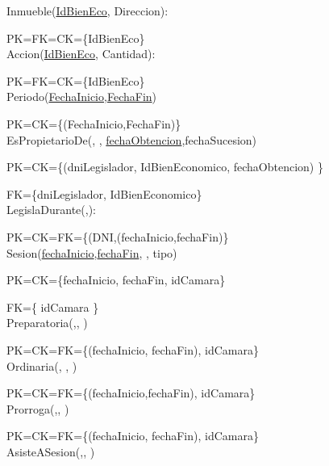 Inmueble(\underline{IdBienEco}, Direccion):

PK=FK=CK={\{IdBienEco}\}\\

Accion(\underline{IdBienEco}, Cantidad):

PK=FK=CK={\{IdBienEco}\}\\

Periodo(\underline{FechaInicio},\underline{FechaFin})

PK=CK={\{(FechaInicio,FechaFin)}\}\\

EsPropietarioDe(\underline{}, \underline{}, \underline{fechaObtencion},fechaSucesion)

PK=CK={\{(dniLegislador, IdBienEconomico, fechaObtencion) }\}

FK={\{dniLegislador, IdBienEconomico}\}\\

LegislaDurante(\underline{},\underline{}):

PK=CK=FK={\{(DNI,(fechaInicio,fechaFin)}\}\\

Sesion(\underline{fechaInicio},\underline{fechaFin}, \underline{}, tipo)

PK=CK={\{fechaInicio, fechaFin, idCamara}\}

FK={\{ idCamara }\} \\

Preparatoria(\underline{},\underline{}, \underline{})

PK=CK=FK={\{(fechaInicio, fechaFin), idCamara}\}\\

Ordinaria(\underline{}, \underline{}, \underline{})

PK=CK=FK={\{(fechaInicio,fechaFin), idCamara}\}\\

Prorroga(\underline{},\underline{}, \underline{})

PK=CK=FK={\{(fechaInicio, fechaFin), idCamara}\}\\

AsisteASesion(\underline{},\underline{}, \underline{})

